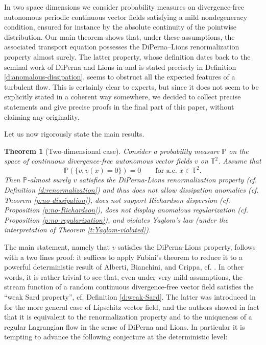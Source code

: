 \documentclass[11pt,reqno]{amsart}
\newtheorem{theorem}{Theorem}[section]
\theoremstyle{definition}
\numberwithin{equation}{section}
\begin{document}
In two space dimensions we consider probability measures on divergence-free autonomous periodic continuous vector fields satisfying a mild nondegeneracy condition, ensured for instance by the absolute continuity of the pointwise distribution.
Our main theorem shows that, under these assumptions, the associated transport equation possesses the DiPerna--Lions renormalization property almost surely. The latter property, whose definition dates back to the seminal work of DiPerna and Lions in \cite{DiPernaLions1989} and is stated precisely in Definition \ref{d:anomalous-dissipation}, seems to obstruct all the expected features of a turbulent flow. This is certainly clear to experts, but since it does not seem to be explicitly stated in a coherent way somewhere, we decided to collect precise statements and give precise proofs in the final part of this paper, without claiming any originality. 

Let us now rigorously state the main results.

\begin{theorem}[Two-dimensional case]\label{t:no-anomaly-2}
Consider a probability measure $\mathbb P$ on the space of continuous divergence-free autonomous vector fields $v$ on $\mathbb T^2$. Assume that 
\[
\mathbb P (\{v: v(x) =0\})=0 \qquad \mbox{for a.e. $x\in \mathbb T^2$.}
\] 
Then $\mathbb{P}$-almost surely $v$ satisfies the DiPerna-Lions renormalization property (cf. Definition \ref{d:renormalization}) and thus does not allow dissipation anomalies (cf. Theorem \ref{p:no-dissipation}), does not support Richardson dispersion (cf. Proposition \ref{p:no-Richardson}), does not display anomalous regularization (cf. Proposition \ref{p:no-regularization}), and violates Yaglom's law (under the interpretation of Theorem \ref{t:Yaglom-violated}). 
\end{theorem}

The main statement, namely that $v$ satisfies the DiPerna-Lions property, follows with a two lines proof: it suffices to apply Fubini's theorem to reduce it to a powerful deterministic result of Alberti, Bianchini, and Crippa, cf. \cite{AlbertiBianchiniCrippa2014}. In other words, it is rather trivial to see that, even under very mild assumptions, the stream function of a random continuous divergence-free vector field satisfies the ``weak Sard property'', cf. Definition \ref{d:weak-Sard}. The latter was introduced in \cite{AlbertiBianchiniCrippa2014} for the more general case of Lipschitz vector field, and the authors showed in fact that it is equivalent to the renormalization property and to the uniqueness of a regular Lagrangian flow in the sense of DiPerna and Lions.  In particular it is tempting to advance the following conjecture at the deterministic level:
\end{document}
